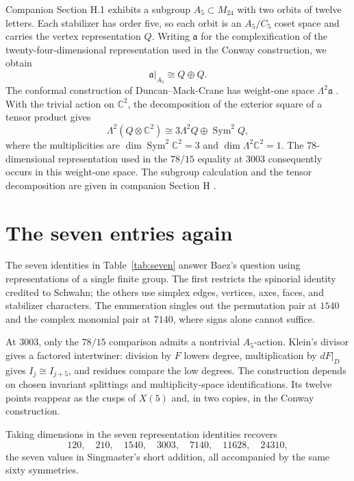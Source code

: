 \documentclass[11pt,a4paper]{article}
\begin{document}
Companion Section H.1 exhibits a subgroup \(A_5\subset M_{24}\) with two orbits of twelve letters. Each stabilizer has order five, so each orbit is an $A_5/C_5$ coset space and carries the vertex representation $Q$. Writing $\mathfrak a$ for the complexification of the twenty-four-dimensional representation used in the Conway construction, we obtain
\[
\mathfrak a|_{A_5}\cong Q\oplus Q.
\]
The conformal construction of Duncan--Mack-Crane has weight-one space $\Lambda^2\mathfrak a$ \citep{DuncanMackCrane2015}. With the trivial action on $\mathbb C^2$, the decomposition of the exterior square of a tensor product gives
\[
\Lambda^2(Q\otimes\mathbb C^2)
\cong3\Lambda^2Q\oplus\operatorname{Sym}^2Q,
\]
where the multiplicities are $\dim\operatorname{Sym}^2\mathbb C^2=3$ and $\dim\Lambda^2\mathbb C^2=1$. The $78$-dimensional representation used in the $78/15$ equality at $3003$ consequently occurs in this weight-one space. The subgroup calculation and the tensor decomposition are given in companion Section H \citep{Companion2026}.

\section{The seven entries again}\label{sec:ending}

The seven identities in Table~\ref{tab:seven} answer Baez's question using representations of a single finite group. The first restricts the spinorial identity credited to Schwahn; the others use simplex edges, vertices, axes, faces, and stabilizer characters. The enumeration singles out the permutation pair at $1540$ and the complex monomial pair at $7140$, where signs alone cannot suffice.

At $3003$, only the $78/15$ comparison admits a nontrivial $A_5$-action. Klein's divisor gives a factored intertwiner: division by $F$ lowers degree, multiplication by $dF|_D$ gives $I_j\cong I_{j+5}$, and residues compare the low degrees. The construction depends on chosen invariant splittings and multiplicity-space identifications. Its twelve points reappear as the cusps of $X(5)$ and, in two copies, in the Conway construction.

Taking dimensions in the seven representation identities recovers
\[
120,\quad210,\quad1540,\quad3003,\quad7140,\quad11628,\quad24310,
\]
the seven values in Singmaster's short addition, all accompanied by the same sixty symmetries.
\end{document}
